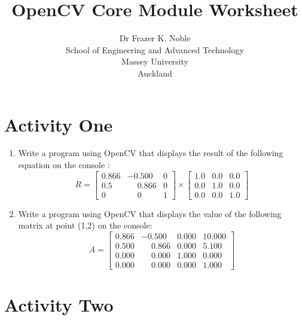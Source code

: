 \documentclass[12pt, A4]{article}
\title{OpenCV Core Module Worksheet}
\author{Dr Frazer K. Noble\\[0.25cm]
    School of Engineering and Advanced Technology\\
    Massey University\\
    Auckland}
\date{}
\begin{document}
\maketitle

\section*{Activity One}

\begin{enumerate}[label=(\alph*)]

    \item Write a program using OpenCV that displays the result of the following equation on the console :
    \begin{equation*}
        R = 
        \begin{bmatrix}
            0.866 & -0.500 & 0\\
            0.5 & \phantom{-}0.866 & 0\\
            0 & \phantom{-}0 & 1
        \end{bmatrix}
        \times
        \begin{bmatrix}
            1.0 & 0.0 & 0.0\\
            0.0 & 1.0 & 0.0\\
            0.0 & 0.0 & 1.0
        \end{bmatrix}
    \end{equation*}

    \item Write a program using OpenCV that displays the value of the following matrix at point (1,2) on the console:
    \begin{equation*}
        A =
        \begin{bmatrix}
            0.866 & -0.500 & 0.000 & 10.000\\
            0.500 & \phantom{-}0.866 & 0.000 & 5.100\\
            0.000 & \phantom{-}0.000 & 1.000 & 0.000\\
            0.000 & \phantom{-}0.000 & 0.000 & 1.000
        \end{bmatrix}
    \end{equation*}

\end{enumerate}


\section*{Activity Two}
\end{document}
